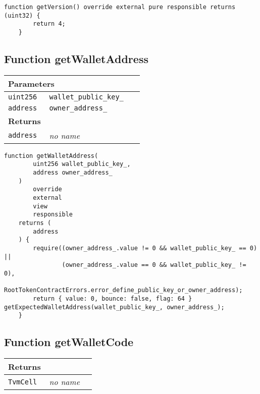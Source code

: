 \begin{lstlisting}[firstnumber=63]
    function getVersion() override external pure responsible returns (uint32) {
        return 4;
    }
\end{lstlisting}

\subsection{Function getWalletAddress}


\ifsoltables
\noindent\begin{tabular}{|l|l|p{5cm}|}\hline
\multicolumn{3}{|l|}{\bf Parameters}\\\hline
\tt uint256 & \tt wallet\_{}public\_{}key\_{} &\\\hline
\tt address & \tt owner\_{}address\_{} &\\\hline
\multicolumn{3}{|l|}{\bf Returns}\\\hline
\tt address & {\em no name} &\\\hline
\end{tabular}
\fi

\vspace{2cm}

\begin{lstlisting}[firstnumber=111]
    function getWalletAddress(
        uint256 wallet_public_key_,
        address owner_address_
    )
        override
        external
        view
        responsible
    returns (
        address
    ) {
        require((owner_address_.value != 0 && wallet_public_key_ == 0) ||
                (owner_address_.value == 0 && wallet_public_key_ != 0),
                RootTokenContractErrors.error_define_public_key_or_owner_address);
        return { value: 0, bounce: false, flag: 64 } getExpectedWalletAddress(wallet_public_key_, owner_address_);
    }
\end{lstlisting}

\subsection{Function getWalletCode}


\ifsoltables
\noindent\begin{tabular}{|l|l|p{5cm}|}\hline
\multicolumn{3}{|l|}{\bf Returns}\\\hline
\tt TvmCell & {\em no name} &\\\hline
\end{tabular}
\fi

\vspace{2cm}

